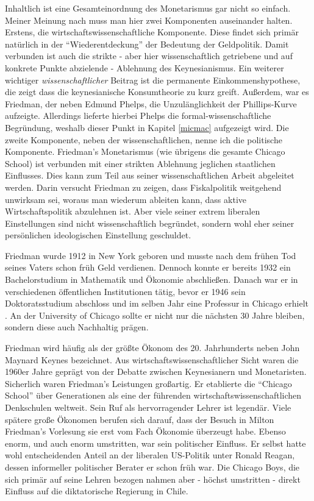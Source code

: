 Inhaltlich ist eine Gesamteinordnung des Monetarismus gar nicht so einfach. Meiner Meinung nach muss man hier zwei Komponenten auseinander halten. Erstens, die wirtschaftswissenschaftliche Komponente. Diese findet sich primär natürlich in der "`Wiederentdeckung"' der Bedeutung der Geldpolitik. Damit verbunden ist auch die strikte - aber hier wissenschaftlich getriebene und auf konkrete Punkte abzielende - Ablehnung des Keynesianismus. Ein weiterer wichtiger \textit{wissenschaftlicher} Beitrag ist die permanente Einkommenshypothese, die zeigt dass die keynesianische Konsumtheorie zu kurz greift. Außerdem, war es Friedman, der neben Edmund Phelps, die Unzulänglichkeit der Phillips-Kurve aufzeigte. Allerdings lieferte hierbei Phelps die formal-wissenschaftliche Begründung, weshalb dieser Punkt in Kapitel \ref{micmac} aufgezeigt wird.
Die zweite Komponente, neben der wissenschaftlichen, nenne ich die politische Komponente. Friedman's Monetarismus (wie übrigens die gesamte Chicago School) ist verbunden mit einer strikten Ablehnung jeglichen staatlichen Einflusses. Dies kann zum Teil aus seiner wissenschaftlichen Arbeit abgeleitet werden. Darin versucht Friedman zu zeigen, dass Fiskalpolitik weitgehend unwirksam sei, woraus man wiederum ableiten kann, dass aktive Wirtschaftspolitik abzulehnen ist. Aber viele seiner extrem liberalen Einstellungen sind nicht wissenschaftlich begründet, sondern wohl eher seiner persönlichen ideologischen Einstellung geschuldet.

Friedman wurde 1912 in New York geboren und musste nach dem frühen Tod seines Vaters schon früh Geld verdienen. Dennoch konnte er bereits 1932 ein Bachelorstudium in Mathematik und Ökonomie abschließen. Danach war er in verschiedenen öffentlichen Institutionen tätig, bevor er 1946 sein Doktoratsstudium abschloss und im selben Jahr eine Professur in Chicago erhielt \parencite[S. 204]{Linss2017}. An der University of Chicago sollte er nicht nur die nächsten 30 Jahre bleiben, sondern diese auch Nachhaltig prägen.

Friedman wird häufig als der größte Ökonom des 20. Jahrhunderts neben John Maynard Keynes bezeichnet. Aus wirtschaftswissenschaftlicher Sicht waren die 1960er Jahre geprägt von der Debatte zwischen Keynesianern und Monetaristen. Sicherlich waren Friedman's Leistungen großartig. Er etablierte die "`Chicago School"' über Generationen als eine der führenden wirtschaftswissenschaftlichen Denkschulen weltweit. Sein Ruf als hervorragender Lehrer ist legendär. Viele spätere große Ökonomen berufen sich darauf, dass der Besuch in Milton Friedman's Vorlesung sie erst vom Fach Ökonomie überzeugt habe. Ebenso enorm, und auch enorm umstritten, war sein politischer Einfluss. Er selbst hatte wohl entscheidenden Anteil an der liberalen US-Politik unter Ronald Reagan, dessen informeller politischer Berater er schon früh war. Die Chicago Boys, die sich primär auf seine Lehren bezogen nahmen aber - höchst umstritten - direkt Einfluss auf die diktatorische Regierung in Chile.

